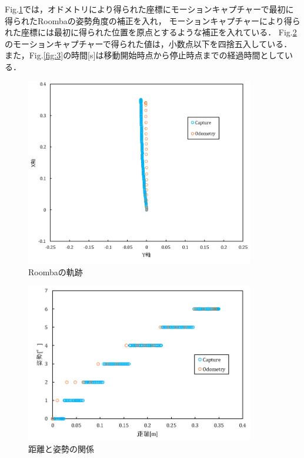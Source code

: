 \documentclass[a4paper,11pt]{jsarticle}
\begin{document}
Fig.{\ref{fig:1}}では，オドメトリにより得られた座標にモーションキャプチャーで最初に得られたRoombaの姿勢角度の補正を入れ，
モーションキャプチャーにより得られた座標には最初に得られた位置を原点とするような補正を入れている．
Fig.{\ref{fig:2}}のモーションキャプチャーで得られた値は，小数点以下を四捨五入している．
また，Fig.{\ref{fig:3}}の時間[s]は移動開始時点から停止時点までの経過時間としている．

\begin{figure}[H] %
        \begin{center}
        \includegraphics[width=100mm]{../graph/Xvs.Y.png}
        \caption{Roombaの軌跡}%
        \label{fig:1}
        \end{center}
\end{figure}
\begin{figure}[H] %
        \begin{center}
        \includegraphics[width=100mm]{../graph/Rotationvs.Distance.png}
        \caption{距離と姿勢の関係}%
        \label{fig:2}
        \end{center}
\end{figure}
\end{document}
